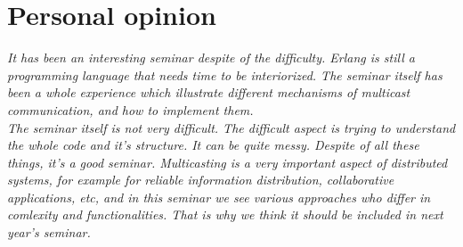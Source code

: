 \clearpage
\section{Personal opinion}

\textit{It has been an interesting seminar despite of the difficulty.
Erlang is still a programming language that needs time to be interiorized.
The seminar itself has been a whole experience which illustrate different mechanisms of multicast communication, and how to implement them.\\
\newline The seminar itself is not very difficult. The difficult aspect is trying to understand the whole code and it's structure. It can be quite messy. Despite of all these things, it's a good seminar.
Multicasting is a very important aspect of distributed systems, for example for reliable information distribution, collaborative applications, etc, and in this seminar we see various approaches who differ in comlexity and functionalities. That is why we think it should be included in next year's seminar.
}